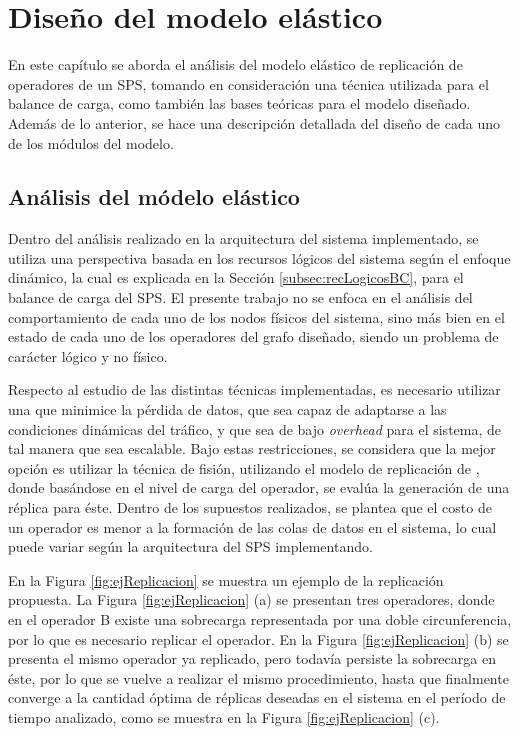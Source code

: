 \chapter{Dise\~no del modelo el\'astico}
\label{cap:disenoSistema}

En este cap\'itulo se aborda el an\'alisis del modelo el\'astico de replicaci\'on de operadores de un SPS, tomando en consideraci\'on una t\'ecnica utilizada para el balance de carga, como tambi\'en las bases te\'oricas para el modelo dise\~nado. Adem\'as de lo anterior, se hace una descripci\'on detallada del dise\~no de cada uno de los m\'odulos del modelo.

\section{An\'alisis del m\'odelo el\'astico}
Dentro del an\'alisis realizado en la arquitectura del sistema implementado, se utiliza una perspectiva basada en los recursos l\'ogicos del sistema seg\'un el enfoque din\'amico, la cual es explicada en la Secci\'on \ref{subsec:recLogicosBC}, para el balance de carga del SPS. El presente trabajo no se enfoca en el an\'alisis del comportamiento de cada uno de los nodos f\'isicos del sistema, sino m\'as bien en el estado de cada uno de los operadores del grafo dise\~nado, siendo un problema de car\'acter l\'ogico y no f\'isico.

Respecto al estudio de las distintas t\'ecnicas implementadas, es necesario utilizar una que minimice la p\'erdida de datos, que sea capaz de adaptarse a las condiciones din\'amicas del tr\'afico, y que sea de bajo \textit{overhead} para el sistema, de tal manera que sea escalable. Bajo estas restricciones, se considera que la mejor opci\'on es utilizar la t\'ecnica de fisi\'on, utilizando el modelo de replicaci\'on de \citep{FernandezMKP13}, donde bas\'andose en el nivel de carga del operador, se eval\'ua la generaci\'on de una r\'eplica para \'este. \normalsize{Dentro de los supuestos realizados}, se plantea que el costo de un operador es menor a la formaci\'on de las colas de datos en el sistema, lo cual puede variar seg\'un la arquitectura del SPS implementando.

En la Figura \ref{fig:ejReplicacion} se muestra un ejemplo de la replicaci\'on propuesta. La Figura \ref{fig:ejReplicacion} (a) se presentan tres operadores, donde en el operador B existe una sobrecarga representada por una doble circunferencia, por lo que es necesario replicar el operador. En la Figura \ref{fig:ejReplicacion} (b) se presenta el mismo operador ya replicado, pero todav\'ia persiste la sobrecarga en \'este, por lo que se vuelve a realizar el mismo procedimiento, hasta que finalmente converge a la cantidad \'optima de r\'eplicas deseadas en el sistema en el per\'iodo de tiempo analizado, como se muestra en la Figura \ref{fig:ejReplicacion} (c).

